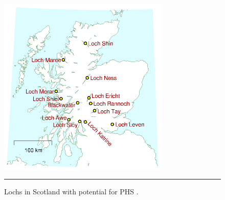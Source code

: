 \begin{figure}[htbp]
	\centering
	\includegraphics[width=.5\textwidth]{figures/map_potential_PHS.png}
	\rule{\textwidth}{0.5pt} %
	\caption{Lochs in Scotland with potential for PHS \citep{MacKayDavid2009}.}
	\label{fig:map_potential_PHS}
\end{figure}